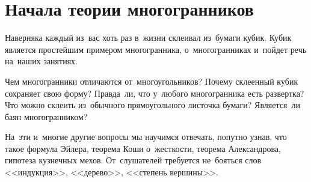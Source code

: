 
\section*{Начала теории многогранников}



Наверняка каждый из~вас хоть раз в~жизни склеивал из~бумаги кубик.
Кубик является простейшим примером многогранника, о~многогранниках и~пойдет
речь на~наших занятиях.

Чем многогранники отличаются от~многоугольников?
Почему склеенный кубик сохраняет свою форму?
Правда~ли, что у~любого многогранника есть развертка?
Что можно склеить из~обычного прямоугольного листочка бумаги?
Является~ли баян многогранником?

На~эти и~многие другие вопросы мы научимся отвечать, попутно узнав, что такое
формула Эйлера, теорема Коши о~жесткости, теорема Александрова, гипотеза
кузнечных мехов.
От~слушателей требуется не~бояться слов <<индукция>>, <<дерево>>,
<<степень вершины>>.

